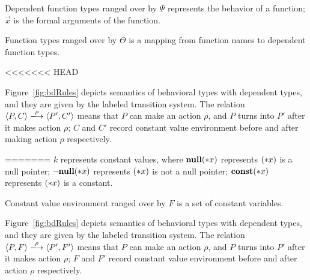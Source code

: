 Dependent function types ranged over by \(\Psi\) represents the
behavior of a function; \(\vec{x}\) is the formal arguments of the
function.

Function types ranged over by \(\Theta\) is a mapping from function names to dependent function types.

<<<<<<< HEAD




Figure~\ref{fig:bdRules} depicts semantics of behavioral types with
dependent types, and they are given by the labeled transition
system. The relation \( \langle P, C \rangle \xlongrightarrow{\rho}
\langle P', C' \rangle \) means that \(P\) can make an action
\(\rho\), and \(P\) turns into \(P'\) after it makes action \(\rho\);
\(C\) and \(C'\) record constant value environment before and after
making action \(\rho\) respectively.


=======
\(k\) represents constant values, where \({\bf null}(*x)\) represents
\((*x)\) is a null pointer; \(\neg{\bf null}(*x)\) represents \((*x)\) is not a
null pointer; \(\mathbf{const}(*x)\) represents \((*x)\) is a constant.

Constant value environment ranged over by \(F\) is a set of constant
variables.

Figure~\ref{fig:bdRules} depicts semantics of behavioral types with
dependent types, and they are given by the labeled transition
system. The relation \( \langle P, F \rangle \xlongrightarrow{\rho}
\langle P', F' \rangle \) means that \(P\) can make an action
\(\rho\), and \(P\) turns into \(P'\) after it makes action \(\rho\);
\(F\) and \(F'\) record constant value environment before and after
action \(\rho\) respectively.

